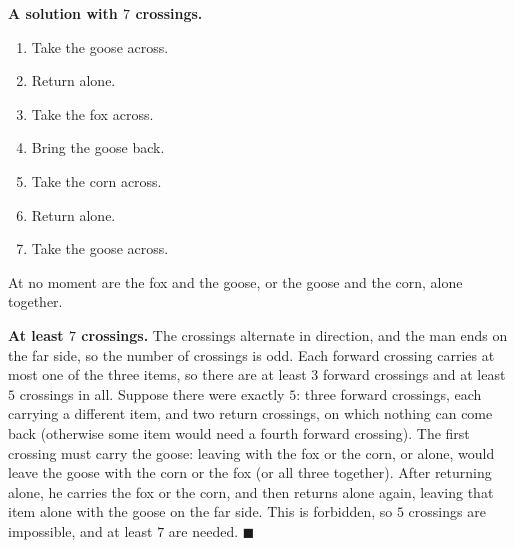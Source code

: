 \textbf{A solution with $7$ crossings.}
\begin{enumerate}
\item Take the goose across.
\item Return alone.
\item Take the fox across.
\item Bring the goose back.
\item Take the corn across.
\item Return alone.
\item Take the goose across.
\end{enumerate}
At no moment are the fox and the goose, or the goose and the corn, alone together.

\textbf{At least $7$ crossings.} The crossings alternate in direction, and the man ends on the far side, so the number of crossings is odd. Each forward crossing carries at most one of the three items, so there are at least $3$ forward crossings and at least $5$ crossings in all. Suppose there were exactly $5$: three forward crossings, each carrying a different item, and two return crossings, on which nothing can come back (otherwise some item would need a fourth forward crossing). The first crossing must carry the goose: leaving with the fox or the corn, or alone, would leave the goose with the corn or the fox (or all three together). After returning alone, he carries the fox or the corn, and then returns alone again, leaving that item alone with the goose on the far side. This is forbidden, so $5$ crossings are impossible, and at least $\boxed{7}$ are needed. $\blacksquare$
